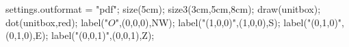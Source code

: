 settings.outformat = "pdf";
size(5cm);
size3(3cm,5cm,8cm);
draw(unitbox);
dot(unitbox,red);
label("$O$",(0,0,0),NW);
label("(1,0,0)",(1,0,0),S);
label("(0,1,0)",(0,1,0),E);
label("(0,0,1)",(0,0,1),Z);